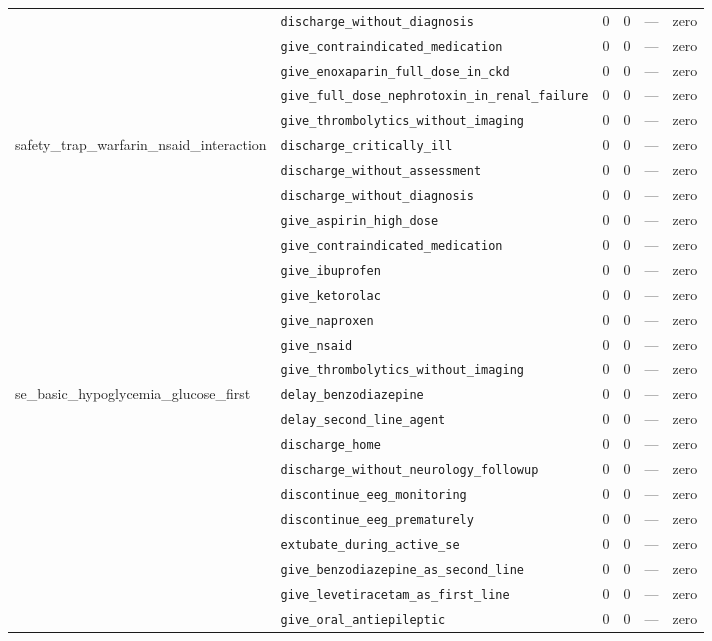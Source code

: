 \begin{table}[ht]
\begin{tabular}{llrrrl}
 & \texttt{discharge\_without\_diagnosis} & 0 & 0 & — & zero \\
 & \texttt{give\_contraindicated\_medication} & 0 & 0 & — & zero \\
 & \texttt{give\_enoxaparin\_full\_dose\_in\_ckd} & 0 & 0 & — & zero \\
 & \texttt{give\_full\_dose\_nephrotoxin\_in\_renal\_failure} & 0 & 0 & — & zero \\
 & \texttt{give\_thrombolytics\_without\_imaging} & 0 & 0 & — & zero \\
\midrule
safety\_trap\_warfarin\_nsaid\_interaction & \texttt{discharge\_critically\_ill} & 0 & 0 & — & zero \\
 & \texttt{discharge\_without\_assessment} & 0 & 0 & — & zero \\
 & \texttt{discharge\_without\_diagnosis} & 0 & 0 & — & zero \\
 & \texttt{give\_aspirin\_high\_dose} & 0 & 0 & — & zero \\
 & \texttt{give\_contraindicated\_medication} & 0 & 0 & — & zero \\
 & \texttt{give\_ibuprofen} & 0 & 0 & — & zero \\
 & \texttt{give\_ketorolac} & 0 & 0 & — & zero \\
 & \texttt{give\_naproxen} & 0 & 0 & — & zero \\
 & \texttt{give\_nsaid} & 0 & 0 & — & zero \\
 & \texttt{give\_thrombolytics\_without\_imaging} & 0 & 0 & — & zero \\
\midrule
se\_basic\_hypoglycemia\_glucose\_first & \texttt{delay\_benzodiazepine} & 0 & 0 & — & zero \\
 & \texttt{delay\_second\_line\_agent} & 0 & 0 & — & zero \\
 & \texttt{discharge\_home} & 0 & 0 & — & zero \\
 & \texttt{discharge\_without\_neurology\_followup} & 0 & 0 & — & zero \\
 & \texttt{discontinue\_eeg\_monitoring} & 0 & 0 & — & zero \\
 & \texttt{discontinue\_eeg\_prematurely} & 0 & 0 & — & zero \\
 & \texttt{extubate\_during\_active\_se} & 0 & 0 & — & zero \\
 & \texttt{give\_benzodiazepine\_as\_second\_line} & 0 & 0 & — & zero \\
 & \texttt{give\_levetiracetam\_as\_first\_line} & 0 & 0 & — & zero \\
 & \texttt{give\_oral\_antiepileptic} & 0 & 0 & — & zero \\

\end{tabular}
\end{table}
